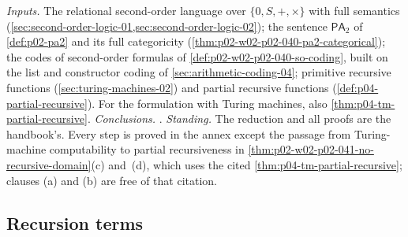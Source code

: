 \emph{Inputs.}  The relational second-order language over
\(\{0,S,+,\times\}\) with full semantics
(\cref{sec:second-order-logic-01,sec:second-order-logic-02}); the sentence
\(\mathsf{PA}_2\) of \cref{def:p02-pa2} and its full categoricity
(\cref{thm:p02-w02-p02-040-pa2-categorical}); the codes of second-order
formulas of \cref{def:p02-w02-p02-040-so-coding}, built on the list and
constructor coding of \cref{sec:arithmetic-coding-04}; primitive recursive
functions (\cref{sec:turing-machines-02}) and partial recursive functions
(\cref{def:p04-partial-recursive}).  For the formulation with Turing
machines, also \cref{thm:p04-tm-partial-recursive}.
\emph{Conclusions.}
.
\emph{Standing.}  The reduction and all proofs are the handbook's.  Every
step is proved in the annex except the passage from Turing-machine
computability to partial recursiveness in
\cref{thm:p02-w02-p02-041-no-recursive-domain}(c) and~(d), which uses the
cited \cref{thm:p04-tm-partial-recursive}; clauses (a) and (b) are free of
that citation.

\subsection{Recursion terms}
\label{sec:p02-w02-p02-041-terms}


